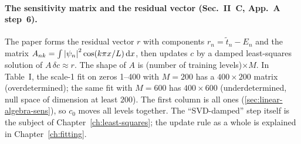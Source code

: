 \paragraph{The sensitivity matrix and the residual vector (Sec.~II~C, App.~A step~6).} The paper forms the residual vector $r$ with components $r_n=\tilde t_n-E_n$ and the matrix $A_{nk}=\int\left\lvert \psi_n\right\rvert^2\cos(k\pi x/L)\,\mathrm{d} x$, then updates $c$ by a damped least-squares solution of $A\,\delta c\approx r$. The shape of $A$ is (number of training levels)$\times M$. In Table~I, the scale-1 fit on zeros 1--400 with $M=200$ has a $400\times200$ matrix (overdetermined); the same fit with $M=600$ has $400\times600$ (underdetermined, null space of dimension at least $200$). The first column is all ones (\cref{sec:linear-algebra-sens}), so $c_0$ moves all levels together. The ``SVD-damped'' step itself is the subject of Chapter~\ref{ch:least-squares}; the update rule as a whole is explained in Chapter~\ref{ch:fitting}.

